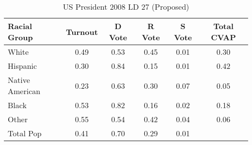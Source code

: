 \begin{table}[htb]
\begin{center}
\caption{US President 2008 LD 27 (Proposed)}
\label{pres08_cvap_ld_27}
\begin{tabular}{lccccc}
  \hline
Racial Group & Turnout & D Vote & R Vote & S Vote & Total CVAP \\ 
  \hline
White & 0.49 & 0.53 & 0.45 & 0.01 & 0.30 \\ 
  Hispanic & 0.30 & 0.84 & 0.15 & 0.01 & 0.42 \\ 
  Native American & 0.23 & 0.63 & 0.30 & 0.07 & 0.05 \\ 
  Black & 0.53 & 0.82 & 0.16 & 0.02 & 0.18 \\ 
  Other & 0.55 & 0.54 & 0.42 & 0.04 & 0.06 \\ 
  Total Pop & 0.41 & 0.70 & 0.29 & 0.01 &  \\ 
   \hline
\end{tabular}
\end{center}
\end{table}

